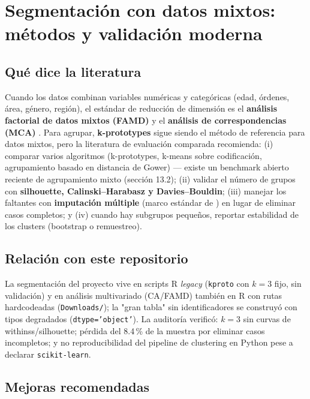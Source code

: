 \section{Segmentación con datos mixtos: métodos y validación moderna}

\subsection{Qué dice la literatura}

Cuando los datos combinan variables numéricas y categóricas (edad, órdenes,
área, género, región), el estándar de reducción de dimensión es el
\textbf{análisis factorial de datos mixtos (FAMD)} \citep{husson2017exploratory}
y el \textbf{análisis de correspondencias (MCA)} \citep{greenacre2017correspondence}.
Para agrupar, \textbf{k-prototypes} \citep{huang1998extensions} sigue siendo el
método de referencia para datos mixtos, pero la literatura de evaluación
comparada recomienda: (i) comparar varios algoritmos (k-prototypes, k-means
sobre codificación, agrupamiento basado en distancia de Gower) — existe un
benchmark abierto reciente de agrupamiento mixto (sección 13.2); (ii) validar
el número de grupos con \textbf{silhouette, Calinski--Harabasz y
Davies--Bouldin}; (iii) manejar los faltantes con \textbf{imputación múltiple}
(marco estándar de \citet{vanbuuren2018flexible}) en lugar de eliminar casos
completos; y (iv) cuando hay subgrupos pequeños, reportar estabilidad de los
clusters (bootstrap o remuestreo).

\subsection{Relación con este repositorio}

La segmentación del proyecto vive en scripts R \emph{legacy}
(\texttt{kproto} con $k=3$ fijo, sin validación) y en análisis multivariado
(CA/FAMD) también en R con rutas hardcodeadas (\texttt{Downloads/}); la "gran
tabla" sin identificadores se construyó con tipos degradados
(\texttt{dtype='object'}). La auditoría verificó: $k=3$ sin curvas de
withinss/silhouette; pérdida del 8.4\,\% de la muestra por eliminar casos
incompletos; y no reproducibilidad del pipeline de clustering en Python pese a
declarar \texttt{scikit-learn}.

\subsection{Mejoras recomendadas}

